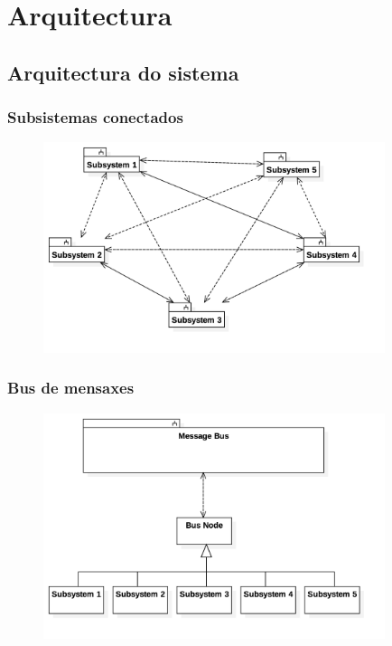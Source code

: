 \documentclass{beamer}
\begin{document}
\section{Arquitectura}
\subsection{Arquitectura do sistema}
\begin{frame}
\frametitle{Subsistemas conectados}

\begin{figure}
	\includegraphics[width=10cm]{../otros/UML/png/arquitectura_mala.png}
	\label{dia:arquitectura_mala}
\end{figure}
\note{

}
\end{frame}
\begin{frame}
\frametitle{Bus de mensaxes}
\begin{figure}
	\includegraphics[width=10cm]{../otros/UML/png/actual_arquitecture.png}
	\label{dia:actual_arquitecture}
\end{figure}
\note{

}
\end{frame}
\end{document}
